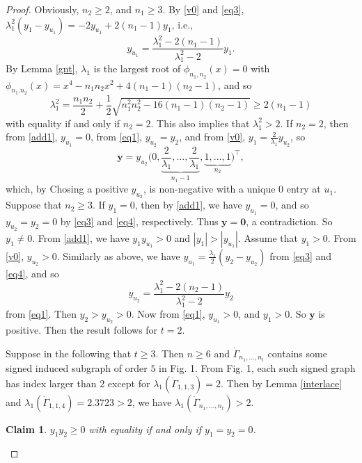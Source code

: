 \documentclass[12pt]{article}
\numberwithin{equation}{section}
\newtheorem {Claim} {Claim}[section]
\begin{document}
\begin{proof}
Obviously, $n_2\ge 2$, and $n_1\ge 3$.  By \eqref{v0} and \eqref{eq3},  $\lambda_1^2(y_1-y_{u_1})=-2y_{u_1}+2(n_1-1)y_1$, i.e., 
\begin{equation}\label{add1}
y_{u_1}=\frac{\lambda_1^2-2(n_1-1)}{\lambda_1^2-2}y_1. 
\end{equation}
By Lemma \ref{gnt}, $\lambda_1$ is the largest root of $\phi_{n_1,n_2}(x)=0$ with $\phi_{n_1.n_2}(x)=x^4-n_1n_2x^2+4(n_1-1)(n_2-1)$, and so
\[
\lambda_1^2=\frac{n_1n_2}{2}+\frac{1}{2}\sqrt{n_1^2n_2^2-16(n_1-1)(n_2-1)}\ge 2(n_1-1)
\]
with equality if and only if $n_2=2$. This also implies that $\lambda_1^2>2$.  
If $n_2=2$, then from \eqref{add1}, 
 $y_{u_1}=0$,  from \eqref{eq1}, $y_{u_2}=y_2$, and from \eqref{v0},
 $y_1=\frac{2}{\lambda_1}y_{u_2}$, so 
 \[
\mathbf{y}=y_{u_2}\bigg(0,\underbrace{\frac{2}{\lambda_1},\dots,\frac{2}{\lambda_1}}_{n_1-1},\underbrace{1,\dots,1}_{n_2}\bigg)^\top,\]
which, by Chosing a positive $y_{u_2}$,   is non-negative with a unique $0$ entry at $u_1$. 
Suppose that $n_2\ge 3$. 
If $y_1=0$, then by \eqref{add1}, we have $y_{u_1}=0$, and so $y_{u_2}=y_2=0$ by \eqref{eq3} and \eqref{eq4}, respectively. Thus $\mathbf{y}=\mathbf{0}$, a contradiction. 
So $y_1\ne 0$. 
From \eqref{add1}, we have $y_1y_{u_1}>0$ and $|y_1|>|y_{u_1}|$. Assume that $y_1>0$. From \eqref{v0}, $y_{u_2}>0$. 
Similarly as above, we have $y_{u_1}=\frac{\lambda_1}{2}(y_2-y_{u_2})$ from 
\eqref{eq3} and \eqref{eq4},
and so 
\[
y_{u_2}=\frac{\lambda_1^2-2(n_2-1)}{\lambda_1^2-2}y_2
\]
from  \eqref{eq1}. Then $y_2>y_{u_2}>0$. Now from \eqref{eq1},  $y_{u_1}>0$, and $y_1>0$. 
So $\mathbf{y}$ is positive.  Then the result follows for $t=2$.



Suppose in the following  that $t\ge 3$. Then $n\ge 6$ and  $\dot\Gamma_{n_1, \dots, n_t}$ contains some signed induced subgraph of order $5$ in Fig. 1.  From Fig. 1, each such signed graph has index larger than $2$ except for $\lambda_1(\dot\Gamma_{1,1,3})=2$.
Then by Lemma \ref{interlace} and $\lambda_1(\dot\Gamma_{1,1,4})=2.3723> 2$, we have $\lambda_1(\dot\Gamma_{n_1, \dots, n_t})> 2$.

\begin{Claim} \label{Y1}
$y_1y_2\ge 0$ 
with equality if and only if $y_1=y_2=0$. 
\end{Claim}


\end{proof}
\end{document}
